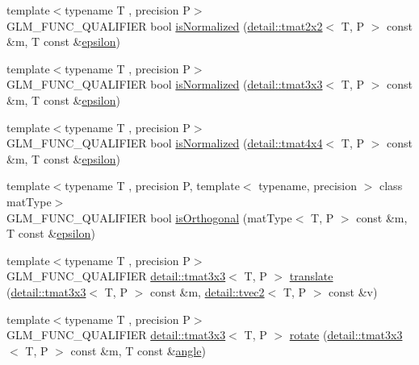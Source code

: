 \begin{DoxyCompactItemize}
\item 
{\footnotesize template$<$typename T , precision P$>$ }\\G\+L\+M\+\_\+\+F\+U\+N\+C\+\_\+\+Q\+U\+A\+L\+I\+F\+I\+ER bool \hyperlink{group__gtx__matrix__query_gaae7339fac94c86ed741f20b6915682ab}{is\+Normalized} (\hyperlink{structglm_1_1detail_1_1tmat2x2}{detail\+::tmat2x2}$<$ T, P $>$ const \&m, T const \&\hyperlink{group__gtc__constants_gacb41049b8d22c8aa90e362b96c524feb}{epsilon})
\item 
{\footnotesize template$<$typename T , precision P$>$ }\\G\+L\+M\+\_\+\+F\+U\+N\+C\+\_\+\+Q\+U\+A\+L\+I\+F\+I\+ER bool \hyperlink{group__gtx__matrix__query_gab4c4106cd851951bad5e78a83bfc75dd}{is\+Normalized} (\hyperlink{structglm_1_1detail_1_1tmat3x3}{detail\+::tmat3x3}$<$ T, P $>$ const \&m, T const \&\hyperlink{group__gtc__constants_gacb41049b8d22c8aa90e362b96c524feb}{epsilon})
\item 
{\footnotesize template$<$typename T , precision P$>$ }\\G\+L\+M\+\_\+\+F\+U\+N\+C\+\_\+\+Q\+U\+A\+L\+I\+F\+I\+ER bool \hyperlink{group__gtx__matrix__query_gad0ff11cc2c26d3086d9f88316a321637}{is\+Normalized} (\hyperlink{structglm_1_1detail_1_1tmat4x4}{detail\+::tmat4x4}$<$ T, P $>$ const \&m, T const \&\hyperlink{group__gtc__constants_gacb41049b8d22c8aa90e362b96c524feb}{epsilon})
\item 
{\footnotesize template$<$typename T , precision P, template$<$ typename, precision $>$ class mat\+Type$>$ }\\G\+L\+M\+\_\+\+F\+U\+N\+C\+\_\+\+Q\+U\+A\+L\+I\+F\+I\+ER bool \hyperlink{group__gtx__matrix__query_gab2cb5d23df77b4e4e63ad2965acd31b3}{is\+Orthogonal} (mat\+Type$<$ T, P $>$ const \&m, T const \&\hyperlink{group__gtc__constants_gacb41049b8d22c8aa90e362b96c524feb}{epsilon})
\item 
{\footnotesize template$<$typename T , precision P$>$ }\\G\+L\+M\+\_\+\+F\+U\+N\+C\+\_\+\+Q\+U\+A\+L\+I\+F\+I\+ER \hyperlink{structglm_1_1detail_1_1tmat3x3}{detail\+::tmat3x3}$<$ T, P $>$ \hyperlink{group__gtx__matrix__transform__2d_gaa73c0e940e66b4e8aebf9dc72f5a7e34}{translate} (\hyperlink{structglm_1_1detail_1_1tmat3x3}{detail\+::tmat3x3}$<$ T, P $>$ const \&m, \hyperlink{structglm_1_1detail_1_1tvec2}{detail\+::tvec2}$<$ T, P $>$ const \&v)
\item 
{\footnotesize template$<$typename T , precision P$>$ }\\G\+L\+M\+\_\+\+F\+U\+N\+C\+\_\+\+Q\+U\+A\+L\+I\+F\+I\+ER \hyperlink{structglm_1_1detail_1_1tmat3x3}{detail\+::tmat3x3}$<$ T, P $>$ \hyperlink{group__gtx__matrix__transform__2d_gae172cd1e33a5c7b82c69a9731eac6c67}{rotate} (\hyperlink{structglm_1_1detail_1_1tmat3x3}{detail\+::tmat3x3}$<$ T, P $>$ const \&m, T const \&\hyperlink{group__gtc__quaternion_ga23a3fc7ada5bbb665ff84c92c6e0542c}{angle})

\end{DoxyCompactItemize}
